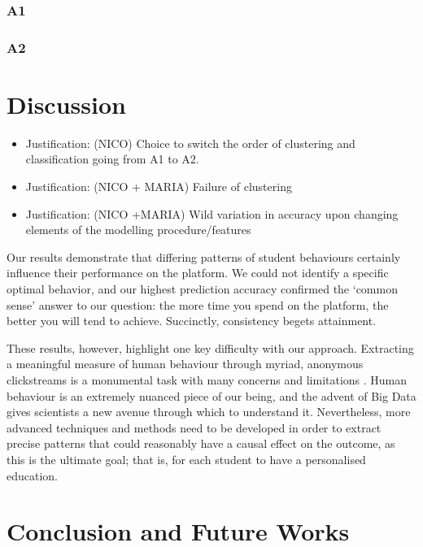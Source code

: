 \documentclass[sigplan,screen]{acmart}
\begin{document}
\subsubsection{A1}



\subsubsection{A2}


\section{Discussion}\label{sec:discussion}

{\color{red}
\begin{itemize}
\item Justification: (NICO) Choice to switch the order of clustering and classification going from A1 to A2. 
    \item Justification: (NICO + MARIA) Failure of clustering
    \item Justification: (NICO +MARIA) Wild variation in accuracy upon changing elements of the modelling procedure/features
\end{itemize}

}

Our results demonstrate that differing patterns of student behaviours certainly influence their performance on the platform. We could not identify a specific optimal behavior, and our highest prediction accuracy confirmed the `common sense' answer to our question: the more time you spend on the platform, the better you will tend to achieve. Succinctly, consistency begets attainment. 

These results, however, highlight one key difficulty with our approach. Extracting a meaningful measure of human behaviour through myriad, anonymous clickstreams is a monumental task with many concerns and limitations \cite{meaningfulmeasures}. Human behaviour is an extremely nuanced piece of our being, and the advent of Big Data gives scientists a new avenue through which to understand it. Nevertheless, more advanced techniques and methods need to be developed in order to extract precise patterns that could reasonably have a causal effect on the outcome, as this is the ultimate goal; that is, for each student to have a personalised education. 





\section{Conclusion and Future Works}\label{sec:conclusion}
\end{document}
